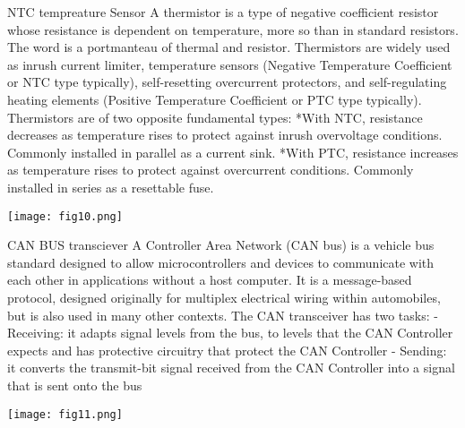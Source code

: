 \documentclass[11pt]{article}
\begin{document}
NTC tempreature Sensor\newline
A thermistor is a type of negative coefficient resistor whose resistance is dependent on temperature, more so than in standard resistors. The word is a portmanteau of thermal and resistor. Thermistors are widely used as inrush current limiter, temperature sensors (Negative Temperature Coefficient or NTC type typically), self-resetting overcurrent protectors, and self-regulating heating elements (Positive Temperature Coefficient or PTC type typically).\newline
\newline
Thermistors are of two opposite fundamental types:\newline
*With NTC, resistance decreases as temperature rises to protect against inrush overvoltage \newline conditions. Commonly installed in parallel as a current sink.\newline
*With PTC, resistance increases as temperature rises to protect against overcurrent conditions. Commonly installed in series as a resettable fuse.\newline
\begin {center}
\texttt{[image: fig10.png]}\newline
\end{center}

CAN BUS transciever\newline
A Controller Area Network (CAN bus) is a vehicle bus standard designed to allow microcontrollers and devices to communicate with each other in applications without a host computer. It is a message-based protocol, designed originally for multiplex electrical wiring within automobiles, but is also used in many other contexts.\newline
The CAN transceiver has two tasks:\newline
- Receiving: it adapts signal levels from the bus, to levels that the CAN Controller expects and has protective circuitry that protect the CAN Controller\newline
- Sending: it converts the transmit-bit signal received from the CAN Controller into a signal that is sent onto the bus\newline
\begin {center}
\texttt{[image: fig11.png]}\newline
\end{center}
\end{document}
